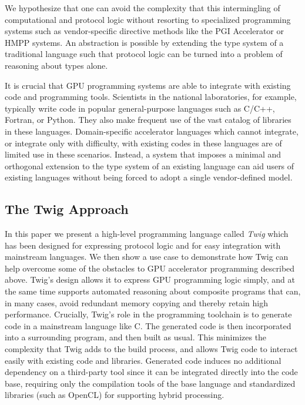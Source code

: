We hypothesize that one can avoid the complexity that this intermingling of computational and protocol logic without resorting to specialized programming systems such as vendor-specific directive methods like the PGI Accelerator\cite{pgi-accelerate} or HMPP\cite{hmpp} systems. An abstraction is possible by extending the type system of a traditional language such that protocol logic can be turned into a problem of reasoning about types alone.

It is crucial that GPU programming systems are able to integrate with existing code and programming tools. Scientists in the national laboratories, for example, typically write code in popular general-purpose languages such as C/C++, Fortran, or Python. They also make frequent use of the vast catalog of libraries in these languages. Domain-specific accelerator languages which cannot integrate, or integrate only with difficulty, with existing codes in these languages are of limited use in these scenarios. Instead, a system that imposes a minimal and orthogonal extension to the type system of an existing language can aid users of existing languages without being forced to adopt a single vendor-defined model.

\subsection{The Twig Approach}

In this paper we present a high-level programming language called \emph{Twig} which has been designed for expressing protocol logic and for easy integration with mainstream languages. We then show a use case to demonstrate how Twig can help overcome some of the obstacles to GPU accelerator programming described above. Twig's design allows it to express GPU programming logic simply, and at the same time supports automated reasoning about composite programs that can, in many cases, avoid redundant memory copying and thereby retain high performance. Crucially, Twig's role in the programming toolchain is to generate code in a mainstream language like C. The generated code is then incorporated into a surrounding program, and then built as usual. This minimizes the complexity that Twig adds to the build process, and allows Twig code to interact easily with existing code and libraries. Generated code induces no additional dependency on a third-party tool since it can be integrated directly into the code base, requiring only the compilation tools of the base language and standardized libraries (such as OpenCL) for supporting hybrid processing.


